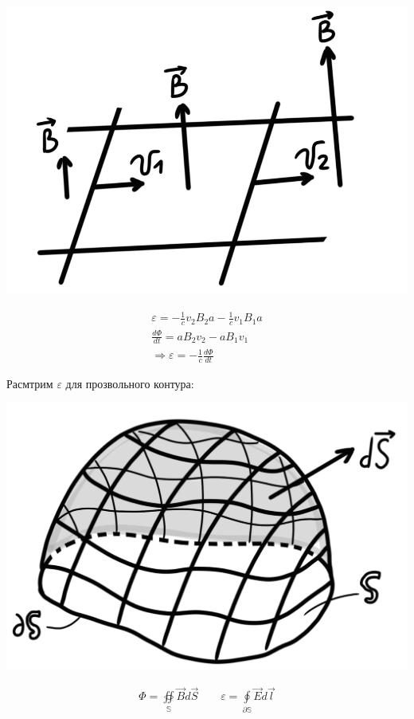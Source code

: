 \begin{minipage}[c]{0.4\textwidth} %
    \includegraphics[width=\textwidth]{im/86.png}%
\end{minipage}%
\hfill
\begin{minipage}[c]{0.6\textwidth} %
    \begin{gather*}
        \varepsilon=-\frac{1}{c}v_2B_2a-\frac{1}{c}v_1B_1a \\
        \frac{d\Phi}{dt}=aB_2v_2-aB_1v_1 \\
        \Rightarrow \varepsilon=-\frac{1}{c}\frac{d\Phi}{dt}   
    \end{gather*}
\end{minipage}

Расмтрим \( \varepsilon \) для прозвольного контура: 

\begin{minipage}[c]{0.4\textwidth} %
    \includegraphics[width=\textwidth]{im/87.png}%
\end{minipage}%
\hfill
\begin{minipage}[c]{0.6\textwidth} %
    \begin{gather*}
        \Phi=\underset{\mathbb{S} }{\oiint}\vec{B}d\vec{S} \qquad \varepsilon=\underset{\partial \mathbb{S} }{\oint}\vec{E}d\vec{l}
    \end{gather*}
\end{minipage}

